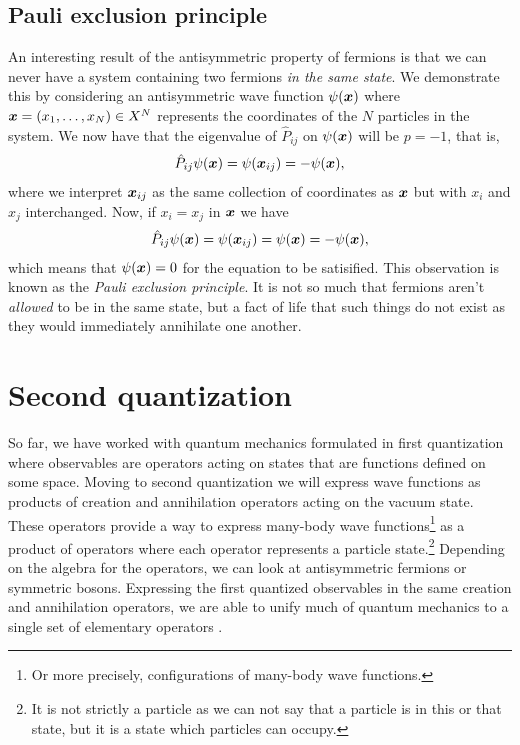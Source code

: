         \subsection{Pauli exclusion principle}
            An interesting result of the antisymmetric property of fermions is
            that we can never have a system containing two fermions \emph{in the
            same state}.
            We demonstrate this by considering an antisymmetric wave function
            $\psi(\boldsymbol{x})$ where $\boldsymbol{x} = (x_1, \dots, x_N) \in X^{N}$
            represents the coordinates of the $N$ particles in the system.
            We now have that the eigenvalue of $\hat{P}_{ij}$ on $\psi(\boldsymbol{x})$
            will be $p = -1$, that is,
            \begin{align}
                \hat{P}_{ij}\psi(\boldsymbol{x})
                = \psi(\boldsymbol{x}_{ij})
                = -\psi(\boldsymbol{x}),
            \end{align}
            where we interpret $\boldsymbol{x}_{ij}$ as the same collection of
            coordinates as $\boldsymbol{x}$ but with $x_i$ and $x_j$ interchanged.
            Now, if $x_i = x_j$ in $\boldsymbol{x}$ we have
            \begin{gather}
                \hat{P}_{ij}\psi(\boldsymbol{x})
                = \psi(\boldsymbol{x}_{ij})
                = \psi(\boldsymbol{x})
                = -\psi(\boldsymbol{x}),
            \end{gather}
            which means that $\psi(\boldsymbol{x}) = 0$ for the equation to be
            satisified.
            This observation is known as the \emph{Pauli exclusion
            principle}.
            It is not so much that fermions aren't \emph{allowed} to be in the
            same state, but a fact of life that such things do not exist as they
            would immediately annihilate one another.


    \section{Second quantization}
        So far, we have worked with quantum mechanics formulated in first
        quantization where observables are operators acting on states that are
        functions defined on some space.
        Moving to second quantization we will express wave functions as products
        of creation and annihilation operators acting on the vacuum state.
        These operators provide a way to express many-body wave
        functions\footnote{%
            Or more precisely, configurations of many-body wave functions.%
        } as a product of operators where each operator represents a particle
        state.\footnote{%
            It is not strictly a particle as we can not say that a particle is
            in this or that state, but it is a state which particles can occupy.
        }
        Depending on the algebra for the operators, we can look at antisymmetric
        fermions or symmetric bosons.
        Expressing the first quantized observables in the same creation and
        annihilation operators, we are able to unify much of quantum mechanics
        to a single set of elementary operators \cite{helgaker-molecular}.

